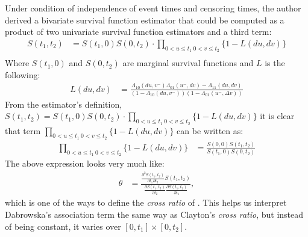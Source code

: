 \documentclass[]{article}
\begin{document}
Under condition of independence of event times and censoring times, the author derived a bivariate survival function estimator that could be computed as a product of two univariate survival function estimators and a third term:
	$$
	\begin{aligned}
		{S}(t_1,t_2) &= {S}(t_1,0){S}(0,t_2)\cdot \prod_{{0<u\leq t_1~0<v\leq t_2}}\{1 - {L}(d u, d v)\}\\
	\end{aligned}
	$$
Where $S(t_1,0)$ and $S(0,t_2)$ are marginal survival functions and $L$ is the following:
	$$
	\begin{aligned}
		L(du, dv) &= \frac{{\Lambda}_{10}(d u,v^-){\Lambda}_{01}(u^-,d v) - {\Lambda}_{11}(du, dv)}{\left(1-{\Lambda}_{10}(d u,v^-)\right)\left(1-{\Lambda}_{01}(u^-,\Delta v)\right)}
	\end{aligned}
	$$
From the estimator's definition, ${S}(t_1,t_2) = {S}(t_1,0){S}(0,t_2)\cdot \prod_{{0<u\leq t_1~0<v\leq t_2}}\{1 - {L}(d u, d v)\}$ it is clear that term $\prod_{{0<u\leq t_1~0<v\leq t_2}}\{1 - {L}(d u, d v)\}$ can be written as:
	$$
	\begin{aligned}
		\prod_{{0<u\leq t_1~0<v\leq t_2}}\{1 - {L}(d u, d v)\} &=
		\frac{S(0,0)  S(t_1,t_2)}{ S(t_1,0)S(0,t_2) }
	\end{aligned}
	$$
The above expression looks very much like:
	$$
	\begin{aligned}
		\theta &= \frac{ \frac{\partial^2 S(t_1,t_2)}{\partial t_1 \partial t_2} S(t_1, t_2)}    {\frac{\partial S(t_1, t_2)}{\partial t_2} \frac{\partial S(t_1, t_2)}{\partial t_1}},
	\end{aligned}
	$$
which is one of the ways to define the \emph{cross ratio} of \cite{clayton1978model}. This helps us interpret Dabrowska's association term the same way as Clayton's \emph{cross ratio}, but instead of being constant, it varies over $[0, t_1]\times [0, t_2]$.\\
\end{document}
